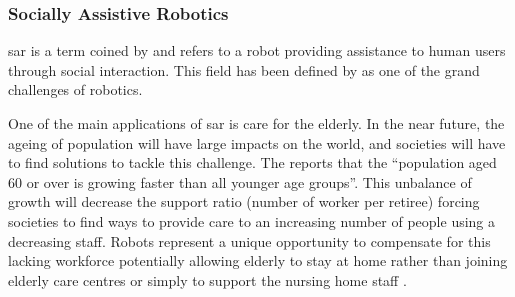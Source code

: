 \subsubsection{Socially Assistive Robotics}

	\gls{sar} is a term coined by \cite{feil2005defining} and refers to a robot providing assistance to human users through social interaction. This field has been defined by \cite{tapus2007socially} as one of the grand challenges of robotics.
	
	One of the main applications of \gls{sar} is care for the elderly. In the near future, the ageing of population will have large impacts on the world, and societies will have to find solutions to tackle this challenge. The \cite{united2017world} reports that the ``population aged 60 or over is growing faster than all younger age groups''. This unbalance of growth will decrease the support ratio (number of worker per retiree) forcing societies to find ways to provide care to an increasing number of people using a decreasing staff. Robots represent a unique opportunity to compensate for this lacking workforce potentially allowing elderly to stay at home rather than joining elderly care centres \citep{di2014web} or simply to support the nursing home staff \citep{wada2004effects}.
	
	
		
